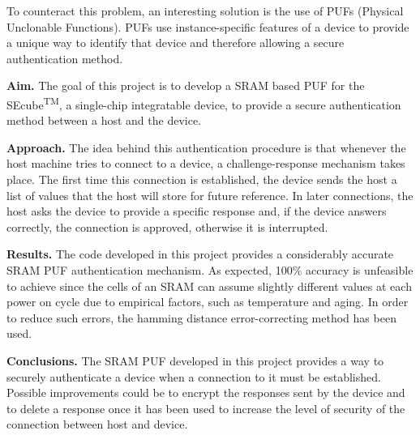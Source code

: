 To counteract this problem, an interesting solution is the use of PUFs (Physical Unclonable Functions). PUFs use instance-specific features of a device to provide a unique way to identify that device and therefore allowing a secure authentication method.

\textbf{Aim.} The goal of this project is to develop a SRAM based PUF for the SEcube\textsuperscript{TM}, a single-chip integratable device, to provide a secure authentication method between a host and the device.

\textbf{Approach.} The idea behind this authentication procedure is that whenever the host machine tries to connect to a device, a challenge-response mechanism takes place. The first time this connection is established, the device sends the host a list of values that the host will store for future reference. In later connections, the host asks the device to provide a specific response and, if the device answers correctly, the connection is approved, otherwise it is interrupted.

\textbf{Results.} The code developed in this project provides a considerably accurate SRAM PUF authentication mechanism. As expected, 100\% accuracy is unfeasible to achieve since the cells of an SRAM can assume slightly different values at each power on cycle due to empirical factors, such as temperature and aging. In order to reduce such errors, the hamming distance error-correcting method has been used.

\textbf{Conclusions.} The SRAM PUF developed in this project provides a way to securely authenticate a device when a connection to it must be established. Possible improvements could be to encrypt the responses sent by the device and to delete a response once it has been used to increase the level of security of the connection between host and device.